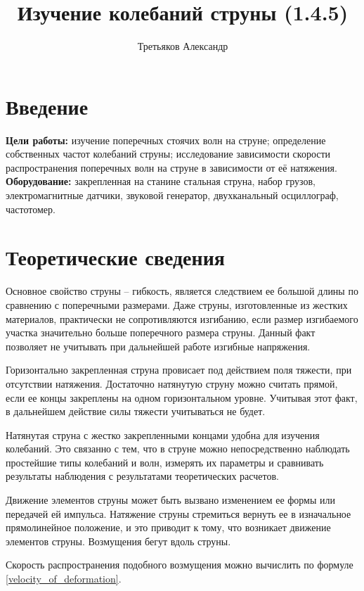 \documentclass[a4paper,12pt]{article}
\title{\textbf{Изучение колебаний струны (1.4.5)}}
\author{Третьяков Александр}
\begin{document}
	
	\maketitle
	
	\section{Введение}
	
	\textbf{Цели работы:} изучение поперечных стоячих волн на струне; определение собственных частот колебаний струны; исследование зависимости скорости распространения поперечных волн на струне в зависимости от её натяжения.\\
	\textbf{Оборудование:} закрепленная на станине стальная струна, набор грузов,
	электромагнитные датчики, звуковой генератор, двухканальный осциллограф, частотомер.
	
	\section{Теоретические сведения}
	
	Основное свойство струны -- гибкость, является следствием ее большой длины по сравнению с поперечными размерами. Даже струны, изготовленные из жестких материалов, практически не сопротивляются изгибанию, если размер изгибаемого участка значительно больше поперечного размера струны. Данный факт позволяет не учитывать при дальнейшей работе изгибные напряжения.
	
	Горизонтально закрепленная струна провисает под действием поля тяжести, при отсутствии натяжения. Достаточно натянутую струну можно считать прямой, если ее концы закреплены на одном горизонтальном уровне. Учитывая этот факт, в дальнейшем действие силы тяжести учитываться не будет.
	
	Натянутая струна с жестко закрепленными концами удобна для изучения колебаний. Это связанно с тем, что в струне можно непосредственно наблюдать простейшие типы колебаний и волн, измерять их параметры и сравнивать результаты наблюдения с результатами теоретических расчетов.
	
	Движение элементов струны может быть вызвано изменением ее формы или передачей ей импульса. Натяжение струны стремиться вернуть ее в изначальное прямолинейное положение, и это приводит к тому, что возникает движение элементов струны. Возмущения бегут вдоль струны.
	
	Скорость распространения подобного возмущения можно вычислить по формуле \eqref{velocity_of_deformation}.
	
\end{document}
